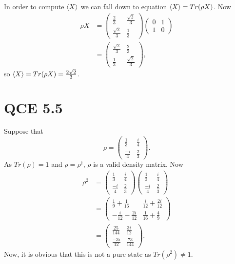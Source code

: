 \documentclass[10pt]{article}
\begin{document}
In order to compute $\braket{X}$ we can fall down to equation $\braket{X} = Tr(\rho X)$. Now
\begin{align*}
\rho X &= 
\begin{pmatrix}
        \frac{2}{3} & \frac{\sqrt{2}}{3} \\
        \frac{\sqrt{2}}{3} & \frac{1}{3}
\end{pmatrix}
\begin{pmatrix}
         0 & 1 \\
         1 & 0
\end{pmatrix} \\
    &= 
    \begin{pmatrix}
    \frac{\sqrt{2}}{3} & \frac{2}{3} \\
    \frac{1}{3}           & \frac{\sqrt{2}}{3}
    \end{pmatrix},
\end{align*}
so $\braket{X} = Tr(\rho X) = \frac{2\sqrt{2}}{3}$.

\section*{QCE 5.5}
Suppose that
\[
\rho = \begin{pmatrix}
\frac{1}{3}  & \frac{i}{4} \\
\frac{-i}{4} & \frac{2}{3}
\end{pmatrix}.
\]
As $Tr(\rho) = 1$ and $\rho = \rho^{\dag}$, $\rho$ is a valid density matrix. Now
\begin{align*}
\rho^2 &= 
\begin{pmatrix}
   \frac{1}{3}  & \frac{i}{4} \\
   \frac{-i}{4} & \frac{2}{3}
\end{pmatrix}
\begin{pmatrix}
   \frac{1}{3}  & \frac{i}{4} \\
   \frac{-i}{4} & \frac{2}{3}
\end{pmatrix} \\
      &= \begin{pmatrix}
         \frac{1}{9} + \frac{1}{16}    &  \frac{i}{12} + \frac{2i}{12} \\
         -\frac{i}{12} - \frac{2i}{12} &  \frac{1}{16} + \frac{4}{9}
      \end{pmatrix} \\
      &= \begin{pmatrix}
      \frac{25}{144} &  \frac{3i}{12} \\
      \frac{-3i}{12}  & \frac{73}{144}
      \end{pmatrix}.
\end{align*}
Now, it is obvious that this is not a pure state as $Tr(\rho^2) \neq 1$.
\end{document}
